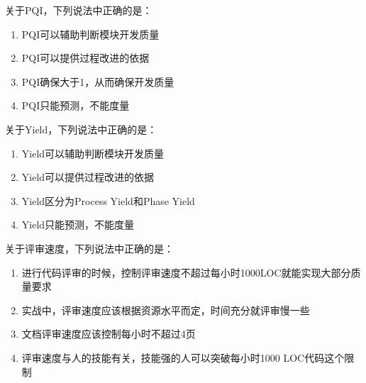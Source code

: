 \begin{problem}
	关于PQI，下列说法中正确的是：
    \vspace{-0.8em}
    \begin{multicols}{2}
        \begin{enumerate}[label=\Alph*.]
            \item PQI可以辅助判断模块开发质量
            \item PQI可以提供过程改进的依据
            \item PQI确保大于1，从而确保开发质量
            \item PQI只能预测，不能度量
        \end{enumerate}
    \end{multicols}
    \vspace{-1em}
\end{problem}



\begin{problem}
	关于Yield，下列说法中正确的是： 
    \vspace{-0.8em}
    \begin{multicols}{2}
        \begin{enumerate}[label=\Alph*.]
            \item Yield可以辅助判断模块开发质量
            \item Yield可以提供过程改进的依据
            \item Yield区分为Process Yield和Phase Yield
            \item Yield只能预测，不能度量
        \end{enumerate}
    \end{multicols}
    \vspace{-1em}
\end{problem}



\begin{problem}
	关于评审速度，下列说法中正确的是：
        \begin{enumerate}[label=\Alph*.]
            \item 进行代码评审的时候，控制评审速度不超过每小时1000LOC就能实现大部分质量要求
            \item 实战中，评审速度应该根据资源水平而定，时间充分就评审慢一些
            \item 文档评审速度应该控制每小时不超过4页
            \item 评审速度与人的技能有关，技能强的人可以突破每小时1000 LOC代码这个限制
        \end{enumerate}
\end{problem}




